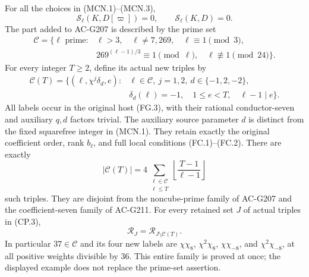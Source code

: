 \begin{theorem}
\label{AC-G215}
For all the choices in (MCN.1)--(MCN.3),
\[
       \mathcal S_\ell(K,D[\varpi])=0,
       \qquad \mathcal S_\ell(K,D)=0.
 \tag{MCN.4}
\]
The part added to AC-G207 is described by the prime set
\[
 \begin{split}
 \mathscr C=\{\ell\text{ prime}:{}&\ell>3,\quad\ell\ne7,269,
                          \quad\ell\equiv1\pmod3,\\
 &269^{(\ell-1)/3}\equiv1\pmod\ell,
                          \quad\ell\not\equiv1\pmod{24}\}.
 \end{split}
 \tag{MCN.5}
\]
For every integer $T\geq2$, define its actual new triples by
\[
 \begin{split}
 \mathcal C(T)=\{(\ell,\chi^j\delta_d,e):{}&\ell\in\mathscr C,
             \ j=1,2,\ d\in\{-1,2,-2\},\\
 &\delta_d(\ell)=-1,\quad1\leq e<T,\quad\ell-1\mid e\}.
 \end{split}
 \tag{MCN.6}
\]
All labels occur in the original host (FG.3), with their
rational conductor-seven and auxiliary $q,d$ factors trivial.
The auxiliary source parameter $d$ is distinct from the fixed
squarefree integer in (MCN.1).
They retain exactly the original coefficient order, rank
$b_\ell$, and full local conditions (FC.1)--(FC.2).
There are exactly
\[
       |\mathcal C(T)|=4\sum_{\substack{\ell\in\mathscr C\\\ell\leq T}}
                         \left\lfloor\frac{T-1}{\ell-1}\right\rfloor
 \tag{MCN.7}
\]
such triples.  They are disjoint from the noncube-prime
family of AC-G207 and the coefficient-seven family of AC-G211.
For every retained set $J$ of actual triples in (CP.3),
\[
                  \mathcal R_J=\mathcal R_{J\setminus\mathcal C(T)}.
 \tag{MCN.8}
\]
In particular $37\in\mathscr C$ and its four new labels are
$\chi\chi_8$, $\chi^2\chi_8$, $\chi\chi_{-8}$, and
$\chi^2\chi_{-8}$, at all positive weights divisible by $36$.
This entire family is proved at once; the displayed example
does not replace the prime-set assertion.
\end{theorem}

